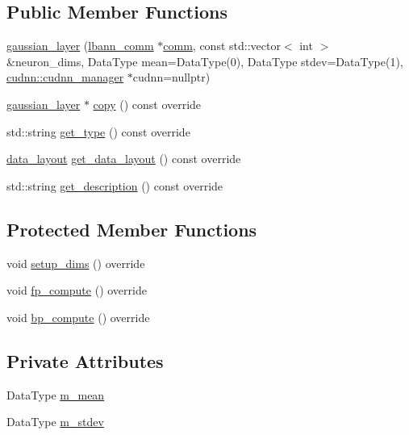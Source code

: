 \subsection*{Public Member Functions}
\begin{DoxyCompactItemize}
\item 
\hyperlink{classlbann_1_1gaussian__layer_af130978295e70d9d6521bf998052d298}{gaussian\+\_\+layer} (\hyperlink{classlbann_1_1lbann__comm}{lbann\+\_\+comm} $\ast$\hyperlink{file__io_8cpp_ab048c6f9fcbcfaa57ce68b00263dbebe}{comm}, const std\+::vector$<$ int $>$ \&neuron\+\_\+dims, Data\+Type mean=Data\+Type(0), Data\+Type stdev=Data\+Type(1), \hyperlink{classlbann_1_1cudnn_1_1cudnn__manager}{cudnn\+::cudnn\+\_\+manager} $\ast$cudnn=nullptr)
\item 
\hyperlink{classlbann_1_1gaussian__layer}{gaussian\+\_\+layer} $\ast$ \hyperlink{classlbann_1_1gaussian__layer_af8522e7d3c3da9a123180b49d9110367}{copy} () const override
\item 
std\+::string \hyperlink{classlbann_1_1gaussian__layer_a7c9082127b954a05359b6cac9f01122c}{get\+\_\+type} () const override
\item 
\hyperlink{base_8hpp_a786677cbfb3f5677b4d84f3056eb08db}{data\+\_\+layout} \hyperlink{classlbann_1_1gaussian__layer_a79dce69c1a681b66849423329f84df30}{get\+\_\+data\+\_\+layout} () const override
\item 
std\+::string \hyperlink{classlbann_1_1gaussian__layer_a0a062897d0660c9a494c98d800aac9e9}{get\+\_\+description} () const override
\end{DoxyCompactItemize}
\subsection*{Protected Member Functions}
\begin{DoxyCompactItemize}
\item 
void \hyperlink{classlbann_1_1gaussian__layer_ab48263a742e407a8d3586ee4ece38768}{setup\+\_\+dims} () override
\item 
void \hyperlink{classlbann_1_1gaussian__layer_a8a0f52d4f365180dbf11e9a09b359c5e}{fp\+\_\+compute} () override
\item 
void \hyperlink{classlbann_1_1gaussian__layer_ab6b5330343feb76668ecac4d5b705d41}{bp\+\_\+compute} () override
\end{DoxyCompactItemize}
\subsection*{Private Attributes}
\begin{DoxyCompactItemize}
\item 
Data\+Type \hyperlink{classlbann_1_1gaussian__layer_a397a47df5968e58fd1fcbfcdc2a3a620}{m\+\_\+mean}
\item 
Data\+Type \hyperlink{classlbann_1_1gaussian__layer_a42dc22c72a46ed4538b7776e24eb0a40}{m\+\_\+stdev}
\end{DoxyCompactItemize}
